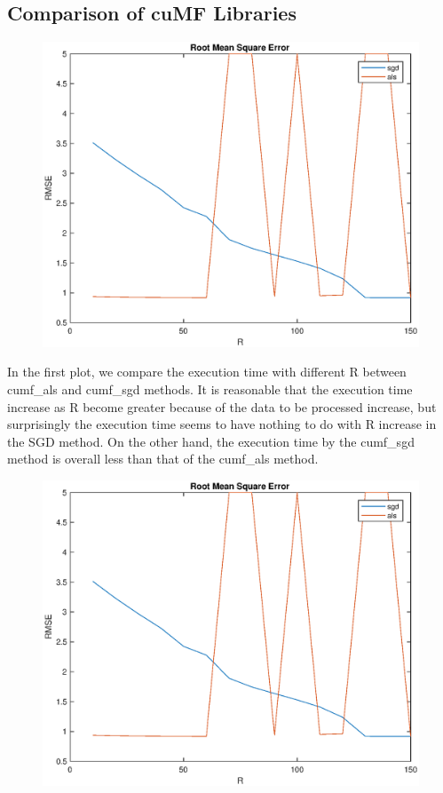 \documentclass[12pt]{article}
\theoremstyle{remark}
\begin{document}
\begin{CJK}{UTF8}{bsmi}
\section{Comparison of cuMF Libraries}
\begin{figure}[H]
    \begin{center}
        \includegraphics[width=500pt]{rmse.eps}
        \label{fig:arch_02}
    \end{center}
\end{figure}
In the first plot, we compare the execution time with different R between cumf\_als and cumf\_sgd methods.  It is reasonable that the execution time increase as R become greater because of the data to be processed increase, but surprisingly the execution time seems to have nothing to do with R increase in the SGD method. On the other hand, the execution time by the cumf\_sgd method is overall less than that of the cumf\_als method.
\begin{figure}[H]
    \begin{center}
        \includegraphics[width=500pt]{time.eps}

\end{center}
\end{figure}
\end{CJK}
\end{document}
